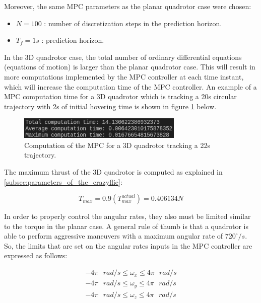 \documentclass{thesisreport}
\begin{document}
Moreover, the same MPC parameters as the planar quadrotor case were chosen:
\begin{itemize}
	\item $N = 100$ : number of discretization steps in the prediction horizon.
	\item $T_f = 1s$ : prediction horizon.
\end{itemize}

In the 3D quadrotor case, the total number of ordinary differential equations (equations of motion) is larger than the planar quadrotor case. This will result in more computations implemented by the MPC controller at each time instant, which will increase the computation time of the MPC controller. An example of a MPC computation time for a 3D quadrotor which is tracking a 20s circular trajectory with 2s of initial hovering time is shown in figure \ref{fig:computation_time_3D_quadrotor} below.

\begin{figure}[h]
	\centering
	\includegraphics[width=0.7\textwidth]{Images/acados_simulations/circular_trajectory/3D_quadrotor/computation_time.png}
	\caption{Computation of the MPC for a 3D quadrotor tracking a 22s trajectory.}
	\label{fig:computation_time_3D_quadrotor}
\end{figure}

The maximum thrust of the 3D quadrotor is computed as explained in \ref{subsec:parameters_of_the_crazyflie}: 

	\begin{equation}
		T_{max} = 0.9 (T_{max}^{actual})=0.406134N
	\end{equation}

In order to properly control the angular rates, they also must be limited similar to the torque in the planar case. A general rule of thumb is that a quadrotor is able to perform aggressive maneuvers with a maximum angular rate of $720^{\circ}/s$. So, the limits that are set on the angular rates inputs in the MPC controller are expressed as follows:

		\begin{align}
			-4 \pi \text{ }rad/s \leq \omega_x \leq 4 \pi \text{ } rad/s \\
			-4 \pi \text{ }rad/s \leq \omega_y \leq 4 \pi \text{ } rad/s \\
			-4 \pi \text{ }rad/s \leq \omega_z \leq 4 \pi \text{ } rad/s
		\end{align}
\end{document}
